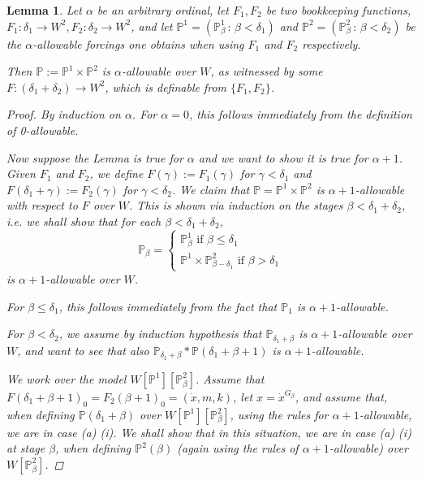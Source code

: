 \documentclass[a4paper,11pt]{article}
\newtheorem{lemma}[theorem]{Lemma}
\newcommand{\forceP}{\mathbb{P}}
\begin{document}
\begin{lemma}
Let $\alpha$ be an arbitrary ordinal, let $F_1, F_2$ be two bookkeeping functions, $F_1: \delta_1 \rightarrow W^2, F_2: \delta_2 \rightarrow W^2$, and let $\forceP^1=(\forceP^1_{\beta} \, : \, \beta < \delta_1)$ and $\forceP^2=(\forceP^2_{\beta} \, : \, \beta < \delta_2)$ be the $\alpha$-allowable forcings one obtains when using $F_1$ and $F_2$ respectively.

Then $\forceP:=\forceP^1 \times \forceP^2$ is $\alpha$-allowable over $W$, as witnessed by some $F: (\delta_1+\delta_2) \rightarrow W^2$, which is definable from $\{F_1,F_2\}$.
\begin{proof}
By induction on $\alpha$. For $\alpha=0$, this follows immediately from the definition of 0-allowable.

Now suppose the Lemma is true for $\alpha$ and we want to show it is true for $\alpha+1$.
Given $F_1$ and $F_2$, we define $F(\gamma):= F_1(\gamma)$ for $\gamma < \delta_1$ and $F(\delta_1+\gamma):= F_2(\gamma)$ for $\gamma< \delta_2$. We claim that
$\forceP=\forceP^1 \times \forceP^2$ is $\alpha+1$-allowable with respect to $F$ over $W$.
This is shown via induction on the stages $\beta< \delta_1 + \delta_2$, i.e. we shall show that for each $\beta < \delta_1+\delta_2$,
 \[ 
 \forceP_{\beta}=  
\begin{cases}
\forceP^1_{\beta} \text{ if $\beta \le \delta_1$} \\
\forceP^1 \times \forceP^2_{\beta - \delta_1} \text{ if $\beta > \delta_1$}
\end{cases}
\]
is $\alpha+1$-allowable over $W$.

For $\beta \le\delta_1$, this follows immediately from the fact that
$\forceP_1$ is $\alpha+1$-allowable. 

For $\beta < \delta_2$, we assume by induction hypothesis that $\forceP_{\delta_1+\beta}$ is $\alpha+1$-allowable over $W$, and want to see that also $\forceP_{\delta_1+ \beta} \ast \forceP(\delta_1+ \beta+1)$ is $\alpha+1$-allowable.

We work over the model $W[\forceP^1] [\forceP^2_{\beta}]$.
Assume that $F(\delta_1 + \beta+1)_0 =F_2(\beta+1)_0=(\dot{x},m,k)$, let $x=\dot{x}^{G_{\beta}}$, and assume that, when defining $\forceP(\delta_1+ \beta )$ over $W [\forceP^1] [\forceP^2_{\beta}]$, using the rules for $\alpha+1$-allowable, we are in case (a) (i).  We shall show that in this situation, we are in case (a) (i) at stage $\beta$, when defining $\forceP^2(\beta)$ (again using the rules of $\alpha+1$-allowable) over $W[ \forceP^2_{\beta} ]$.


\end{proof}
\end{lemma}
\end{document}
